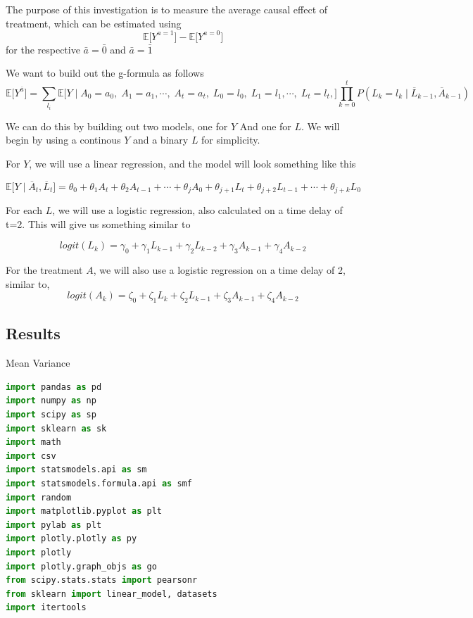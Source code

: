 The purpose of this investigation is to measure the average causal
effect of treatment, which can be estimated using
\[ \mathbb{E}\big[Y^{a=1}\big] - \mathbb{E}\big[Y^{a=0}\big]\] for the
respective \(\bar{a} = \bar{0}\) and \(\bar{a} = \bar{1}\)

We want to build out the g-formula as follows\\
\[ \mathbb{E} \big[Y^{\overline{a}}\big]  = \sum_{l_i} \mathbb{E} \big[Y \mid A_{0} = a_{0},  \; A_{1} = a_{1}, \cdots, \; A_{t} = a_{t},  \; L_{0} = l_0, \; L_{1} = l_1, \cdots, \; L_{t} = l_t,\big] \prod_{k=0}^t P(L_k = l_k \mid \overline{L}_{k-1}, \overline{A}_{k-1})  \]

We can do this by building out two models, one for \(Y\) And one for
\(L\). We will begin by using a continous \(Y\) and a binary \(L\) for
simplicity.

For \(Y\), we will use a linear regression, and the model will look
something like this

\[\mathbb{E} \big[Y \mid \overline{A}_t, \overline{L}_t \big] = \theta_{0} + \theta_1 A_{t}+ \theta_2 A_{t-1} + \cdots + \theta_j A_0 + \theta_{j+1} L_t + \theta_{j+2} L_{t-1} + \cdots + \theta_{j+k} L_0 \]

For each \(L\), we will use a logistic regression, also calculated on a
time delay of t=2. This will give us something similar to

\[ logit(L_k) = \gamma_0 + \gamma_1 L_{k-1} + \gamma_2 L_{k-2} + \gamma_3 A_{k-1} + \gamma_4 A_{k-2} \]

For the treatment \(A\), we will also use a logistic regression on a
time delay of 2, similar to,
\[ logit(A_k) = \zeta_0 + \zeta_1 L_{k} + \zeta_2 L_{k-1} + \zeta_3 A_{k-1} + \zeta_4 A_{k-2} \]

\subsection{Results}\label{results}

Mean Variance

\begin{lstlisting}[language=Python]
import pandas as pd
import numpy as np
import scipy as sp
import sklearn as sk
import math
import csv
import statsmodels.api as sm
import statsmodels.formula.api as smf
import random
import matplotlib.pyplot as plt
import pylab as plt
import plotly.plotly as py
import plotly
import plotly.graph_objs as go
from scipy.stats.stats import pearsonr   
from sklearn import linear_model, datasets
import itertools
\end{lstlisting}

